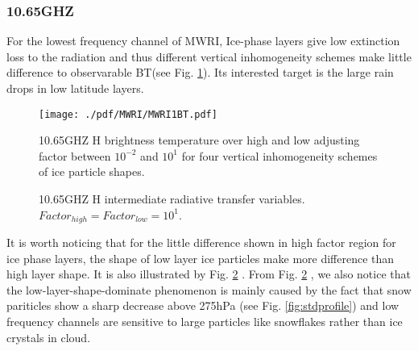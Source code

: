 \documentclass[a4paper]{report}
\begin{document}
\subsubsection{10.65GHZ}
For the lowest frequency channel of MWRI, Ice-phase layers give low extinction loss to the radiation and thus different vertical inhomogeneity
schemes make little difference to observarable BT(see Fig. \ref{fig:MWRI1BT}). Its interested target is the large rain drops in low latitude layers.

\begin{figure}[hbtp] 
\centering
\texttt{[image: ./pdf/MWRI/MWRI1BT.pdf]}
\caption{10.65GHZ H brightness temperature over high and low adjusting factor between $10^{-2}$ and $10^{1}$ for four vertical 
inhomogeneity schemes of ice particle shapes.}
\label{fig:MWRI1BT}
\end{figure}

\begin{figure}[hbtp] 
\centering
{}
\caption{10.65GHZ H intermediate radiative transfer variables. $Factor_{high} = Factor_{low} = 10^{1}$.}
\label{fig:MWRI1rad}
\end{figure}

It is worth noticing that for the little difference shown in high factor region for ice phase layers, the shape of low layer ice particles
make more difference than high layer shape. It is also illustrated by Fig. \ref{fig:MWRI1rad} .
From Fig. \ref{fig:MWRI1rad} , we also notice that the low-layer-shape-dominate phenomenon is mainly 
caused by the fact that snow pariticles show a sharp decrease above 275hPa (see Fig. \ref{fig:stdprofile}) and low frequency channels are sensitive to large particles
like snowflakes rather than ice crystals in cloud.
\end{document}
